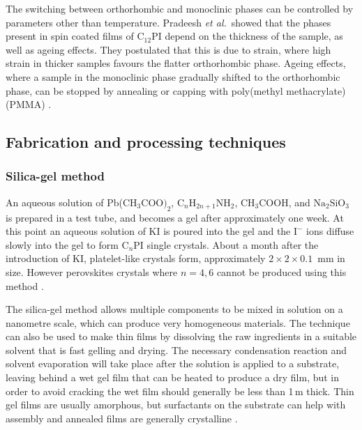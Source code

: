 The switching between orthorhombic and monoclinic phases can be controlled by parameters other than temperature. Pradeesh \textit{et al.}\ showed that the phases present in spin coated films of $\textrm{C}_{12}$PI depend on the thickness of the sample, as well as ageing effects. They postulated that this is due to strain, where high strain in thicker samples favours the flatter orthorhombic phase. Ageing effects, where a sample in the monoclinic phase gradually shifted to the orthorhombic phase, can be stopped by annealing or capping with poly(methyl methacrylate) (PMMA) \cite{Pradeesh2009}.

\subsection{Fabrication and processing techniques}
\subsubsection{Silica-gel method}
An aqueous solution of Pb($\textrm{CH}_3 \textrm{COO)}_2$, $\textrm{C}_n\textrm{H}_{2n+1}\textrm{NH}_2$, $\textrm{CH}_3$COOH, and $\textrm{Na}_2\textrm{SiO}_3$ is prepared in a test tube, and becomes a gel after approximately one week. At this point an aqueous solution of KI is poured into the gel and the $\textrm{I}^-$ ions diffuse slowly into the gel to form $\textrm{C}_n$PI single crystals. About a month after the introduction of KI, platelet-like crystals form, approximately $2\times 2\times 0.1$~mm in size. However perovskites crystals where $n=4,6$ cannot be produced using this method \cite{Ishihara1990}.

The silica-gel method allows multiple components to be mixed in solution on a nanometre scale, which can produce very homogeneous materials. The technique can also be used to make thin films by dissolving the raw ingredients in a suitable solvent that is fast gelling and drying. The necessary condensation reaction and solvent evaporation will take place after the solution is applied to a substrate, leaving behind a wet gel film that can be heated to produce a dry film, but in order to avoid cracking the wet film should generally be less than 1\,\textmu m thick. Thin gel films are usually amorphous, but surfactants on the substrate can help with assembly and annealed films are generally crystalline \cite{Mitzi2001b}.


